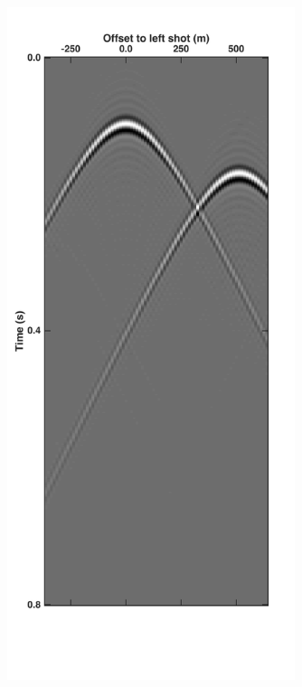 \begin{figure}
	\centering
	\begin{subfigure}[t]{0.25\textwidth}
		\centering
		\includegraphics[width=0.925\textwidth]{Plots/Mahdad/30iter/Pseudo-DeblendedCSG_sh2}	

\end{subfigure}
\end{figure}
